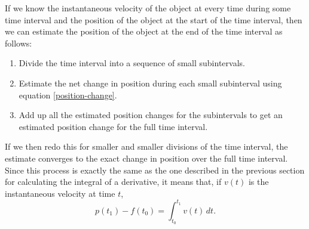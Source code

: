 \documentclass{math-deane}
\begin{document}
If we know the instantaneous velocity of the object at every time during some time interval and the position of the object at the start of the time interval, then we can estimate the position of the object at the end of the time interval as follows:
\begin{enumerate}
\item Divide the time interval into a sequence of small subintervals.
\item Estimate the net change in position during each small subinterval using equation \eqref{position-change}.
\item Add up all the estimated position changes for the subintervals to get an estimated position change for the full time interval.
\end{enumerate}
If we then redo this for smaller and smaller divisions of the time interval, the estimate converges to the exact change in position over the full time interval. Since this process is exactly the same as the one described in the previous section for calculating the integral of a derivative, it means that, if $v(t)$ is the instantaneous velocity at time $t$, 
\[
p(t_1) - f(t_0) = \int_{t_0}^{t_1} v(t)\,dt.
\]
\end{document}
